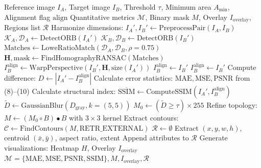 \documentclass[conference]{IEEEtran}
\begin{document}
\begin{algorithm}[htbp]
\caption{ImageDiff Anomaly Localization and Comparison}
\label{alg_pipeline}
\begin{algorithmic}[1]
\REQUIRE Reference image $I_A$, Target image $I_B$, Threshold $\tau$, Minimum area $A_{\min}$, Alignment flag $\text{align}$
\ENSURE Quantitative metrics $\mathcal{M}$, Binary mask $M$, Overlay $I_{\text{overlay}}$, Regions list $\mathcal{R}$
\STATE Harmonize dimensions: $I_A', I_B' \leftarrow \text{PreprocessPair}(I_A, I_B)$
    \STATE $\mathcal{K}_A, \mathcal{D}_A \leftarrow \text{DetectORB}(I_A')$
    \STATE $\mathcal{K}_B, \mathcal{D}_B \leftarrow \text{DetectORB}(I_B')$
    \STATE $\text{Matches} \leftarrow \text{LoweRatioMatch}(\mathcal{D}_A, \mathcal{D}_B, \rho=0.75)$
        \STATE $\mathbf{H}, \text{mask} \leftarrow \text{FindHomographyRANSAC}(\text{Matches})$
        \STATE $I_B^{\text{align}} \leftarrow \text{WarpPerspective}(I_B', \mathbf{H}, \text{size}(I_A'))$
    \ELSE
        \STATE $I_B^{\text{align}} \leftarrow I_B'$ 
    \ENDIF
\ELSE
    \STATE $I_B^{\text{align}} \leftarrow I_B'$
\ENDIF
\STATE Compute difference: $D \leftarrow |I_A' - I_B^{\text{align}}|$
\STATE Calculate error statistics: $\text{MAE}, \text{MSE}, \text{PSNR}$ from (8)--(10)
\STATE Calculate structural index: $\overline{\text{SSIM}} \leftarrow \text{ComputeSSIM}(I_A', I_B^{\text{align}})$
\STATE $\widetilde{D} \leftarrow \text{GaussianBlur}(D_{\text{gray}}, k=(5, 5))$
\STATE $M_0 \leftarrow (\widetilde{D} \ge \tau) \times 255$
\STATE Refine topology: $M \leftarrow (M_0 \circ B) \bullet B$ with $3 \times 3$ kernel
\STATE Extract contours: $\mathcal{C} \leftarrow \text{FindContours}(M, \text{RETR\_EXTERNAL})$
\STATE $\mathcal{R} \leftarrow \emptyset$
        \STATE Extract $(x, y, w, h)$, centroid $(\bar{x}, \bar{y})$, aspect ratio, extent
        \STATE Append attributes to $\mathcal{R}$
    \ENDIF
\ENDFOR
\STATE Generate visualizations: Heatmap $H$, Overlay $I_{\text{overlay}}$
\RETURN $\mathcal{M} = \{\text{MAE}, \text{MSE}, \text{PSNR}, \text{SSIM}\}, M, I_{\text{overlay}}, \mathcal{R}$
\end{algorithmic}
\end{algorithm}
\end{document}
